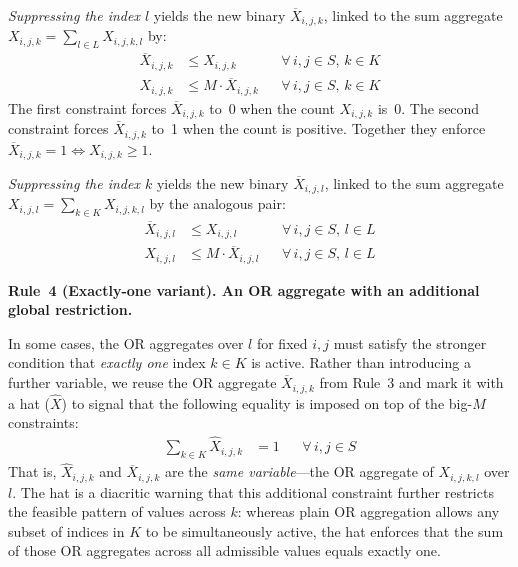\begin{convention}
\smallskip
\noindent\emph{Suppressing the index $l$} yields the new binary $\overline{X}_{i, j, k}$, linked to the sum aggregate $X_{i, j, k} = \sum_{l\in L} X_{i, j, k, l}$ by:
%
\begin{align}
  \overline{X}_{i, j, k}
    &\leq X_{i, j, k}
  && \forall\, i, j \in S, \, k \in K
  \label{eq:or-l-lb}\\
  X_{i, j, k}
    &\leq M\cdot\overline{X}_{i, j, k}
  && \forall\, i, j \in S, \, k \in K
  \label{eq:or-l-ub}
\end{align}
%
The first constraint forces $\overline{X}_{i, j, k}$ to~0 when the count $X_{i, j, k}$ is~0.
The second constraint forces $\overline{X}_{i, j, k}$ to~1 when the count is positive.
Together they enforce $\overline{X}_{i, j, k} = 1 \iff X_{i, j, k} \geq 1$.

\smallskip
\noindent\emph{Suppressing the index $k$} yields the new binary $\overline{X}_{i, j, l}$, linked to the sum aggregate $X_{i, j, l} = \sum_{k\in K} X_{i, j, k, l}$ by the analogous pair:
%
\begin{align}
  \overline{X}_{i, j, l}
    &\leq X_{i, j, l}
  && \forall\, i, j \in S, \, l \in L
  \label{eq:or-k-lb}\\
  X_{i, j, l}
    &\leq M\cdot\overline{X}_{i, j, l}
  && \forall\, i, j \in S, \, l \in L
  \label{eq:or-k-ub}
\end{align}

\medskip
\noindent\textbf{Rule~4 (Exactly-one variant).
  An OR aggregate with an additional global restriction.}

In some cases, the OR aggregates over $l$ for fixed $i, j$ must satisfy the stronger condition that \emph{exactly one} index $k \in K$ is active.
Rather than introducing a further variable, we reuse the OR aggregate $\overline{X}_{i, j, k}$ from Rule~3 and mark it with a hat ($\hat{X}$) to signal that the following equality is imposed on top of the big-$M$ constraints:
%
\begin{align}
  \sum_{k\in K} \hat{X}_{i, j, k}
    &= 1
  && \forall\, i, j \in S
  \label{eq:exactly-one}
\end{align}
%
That is, $\hat{X}_{i, j, k}$ and $\overline{X}_{i, j, k}$ are the \emph{same variable}---the OR aggregate of $X_{i, j, k, l}$ over $l$.
The hat is a diacritic warning that this additional constraint further restricts the feasible pattern of values across $k$: whereas plain OR aggregation allows any subset of indices in $K$ to be simultaneously active, the hat enforces that the sum of those OR aggregates across all admissible values equals exactly one.

\end{convention}
